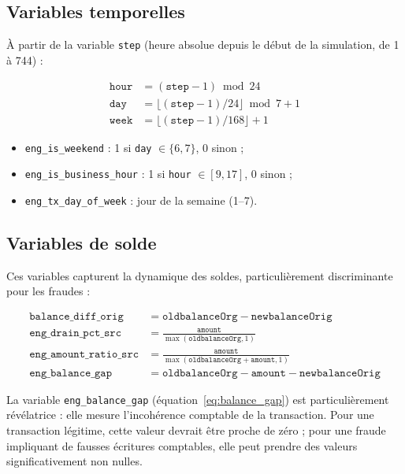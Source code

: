 \documentclass[12pt,a4paper,twoside]{report}
\theoremstyle{definition}
\begin{document}
\subsection{Variables temporelles}

À partir de la variable \texttt{step} (heure absolue depuis le début de la
simulation, de 1 à 744) :

\begin{align}
\texttt{hour} &= (\texttt{step} - 1) \bmod 24 \label{eq:hour} \\
\texttt{day}  &= \lfloor (\texttt{step} - 1) / 24 \rfloor \bmod 7 + 1 \label{eq:day} \\
\texttt{week} &= \lfloor (\texttt{step} - 1) / 168 \rfloor + 1 \label{eq:week}
\end{align}

\begin{itemize}
  \item \texttt{eng\_is\_weekend} : 1 si \texttt{day} $\in \{6, 7\}$, 0 sinon ;
  \item \texttt{eng\_is\_business\_hour} : 1 si \texttt{hour} $\in [9, 17]$, 0 sinon ;
  \item \texttt{eng\_tx\_day\_of\_week} : jour de la semaine (1--7).
\end{itemize}

\subsection{Variables de solde}

Ces variables capturent la dynamique des soldes, particulièrement discriminante
pour les fraudes :

\begin{align}
\texttt{balance\_diff\_orig} &= \texttt{oldbalanceOrg} - \texttt{newbalanceOrig}
  \label{eq:balance_diff} \\
\texttt{eng\_drain\_pct\_src} &= \frac{\texttt{amount}}{\max(\texttt{oldbalanceOrg}, 1)}
  \label{eq:drain_pct} \\
\texttt{eng\_amount\_ratio\_src} &= \frac{\texttt{amount}}{\max(\texttt{oldbalanceOrg} + \texttt{amount}, 1)}
  \label{eq:amount_ratio} \\
\texttt{eng\_balance\_gap} &= \texttt{oldbalanceOrg} - \texttt{amount} - \texttt{newbalanceOrig}
  \label{eq:balance_gap}
\end{align}

La variable \texttt{eng\_balance\_gap} (équation~\ref{eq:balance_gap}) est
particulièrement révélatrice : elle mesure l'incohérence comptable de la transaction.
Pour une transaction légitime, cette valeur devrait être proche de zéro ; pour une
fraude impliquant de fausses écritures comptables, elle peut prendre des valeurs
significativement non nulles.
\end{document}
